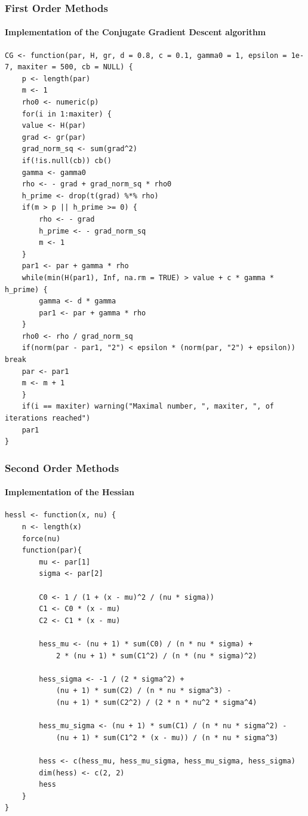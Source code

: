\documentclass[aspectratio=169]{beamer}
\begin{document}
\begin{frame}[fragile]
    \frametitle{First Order Methods}
    \framesubtitle{Implementation of the Conjugate Gradient Descent algorithm}
\begin{verbatim}
CG <- function(par, H, gr, d = 0.8, c = 0.1, gamma0 = 1, epsilon = 1e-7, maxiter = 500, cb = NULL) {
    p <- length(par)
    m <- 1
    rho0 <- numeric(p)
    for(i in 1:maxiter) {
    value <- H(par)
    grad <- gr(par)
    grad_norm_sq <- sum(grad^2)
    if(!is.null(cb)) cb()
    gamma <- gamma0
    rho <- - grad + grad_norm_sq * rho0
    h_prime <- drop(t(grad) %*% rho)
    if(m > p || h_prime >= 0) {
        rho <- - grad
        h_prime <- - grad_norm_sq 
        m <- 1
    }
    par1 <- par + gamma * rho
    while(min(H(par1), Inf, na.rm = TRUE) > value + c * gamma * h_prime) {
        gamma <- d * gamma
        par1 <- par + gamma * rho
    }
    rho0 <- rho / grad_norm_sq
    if(norm(par - par1, "2") < epsilon * (norm(par, "2") + epsilon)) break
    par <- par1
    m <- m + 1
    }
    if(i == maxiter) warning("Maximal number, ", maxiter, ", of iterations reached")
    par1
}
\end{verbatim}
\end{frame}

\begin{frame}[fragile]
    \frametitle{Second Order Methods}
    \framesubtitle{Implementation of the Hessian}

\begin{verbatim}
hessl <- function(x, nu) {
    n <- length(x)
    force(nu)
    function(par){
        mu <- par[1]
        sigma <- par[2]
        
        C0 <- 1 / (1 + (x - mu)^2 / (nu * sigma))
        C1 <- C0 * (x - mu)
        C2 <- C1 * (x - mu)
        
        hess_mu <- (nu + 1) * sum(C0) / (n * nu * sigma) + 
            2 * (nu + 1) * sum(C1^2) / (n * (nu * sigma)^2)
        
        hess_sigma <- -1 / (2 * sigma^2) + 
            (nu + 1) * sum(C2) / (n * nu * sigma^3) -
            (nu + 1) * sum(C2^2) / (2 * n * nu^2 * sigma^4)
    
        hess_mu_sigma <- (nu + 1) * sum(C1) / (n * nu * sigma^2) -
            (nu + 1) * sum(C1^2 * (x - mu)) / (n * nu * sigma^3)
        
        hess <- c(hess_mu, hess_mu_sigma, hess_mu_sigma, hess_sigma)
        dim(hess) <- c(2, 2)
        hess
    }
}
\end{verbatim}
\end{frame}
\end{document}
